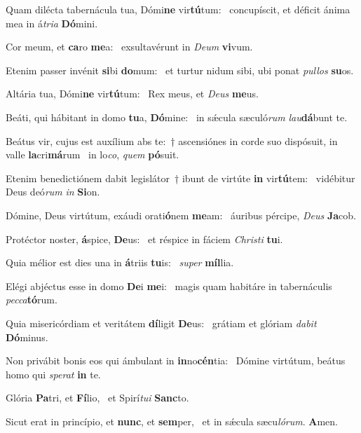 \item Quam dilécta tabernácula tua, Dómi\textbf{ne} vir\textbf{tú}tum:~\psstar{} concupíscit, et déficit ánima mea in á\textit{tria} \textbf{Dó}mini.
\item Cor meum, et \textbf{ca}ro \textbf{me}a:~\psstar{} exsultavérunt in \textit{Deum} \textbf{vi}vum.
\item Etenim passer invénit \textbf{si}bi \textbf{do}mum:~\psstar{} et turtur nidum sibi, ubi ponat \textit{pullos} \textbf{su}os.
\item Altária tua, Dómi\textbf{ne} vir\textbf{tú}\-tum:~\psstar{} Rex meus, et \textit{Deus} \textbf{me}us.
\item Beáti, qui hábitant in domo \textbf{tu}a, \textbf{Dó}mine:~\psstar{} in sǽcula sæculó\textit{rum} \textit{lau}\textbf{dá}bunt te.
\item Beátus vir, cujus est auxílium abs te:~† ascensiónes in corde suo dispósuit, in valle \textbf{la}cri\textbf{má}rum~\psstar{} in lo\textit{co}, \textit{quem} \textbf{pó}suit.
\item Etenim benedictiónem dabit legislátor~† ibunt de virtúte \textbf{in} vir\textbf{tú}tem:~\psstar{} vidébitur Deus deó\textit{rum} \textit{in} \textbf{Si}on.
\item Dómine, Deus virtútum, exáudi orati\textbf{ó}nem \textbf{me}am:~\psstar{} áuribus pércipe, \textit{Deus} \textbf{Ja}cob.
\item Protéctor noster, \textbf{á}spice, \textbf{De}us:~\psstar{} et réspice in fáciem \textit{Christi} \textbf{tu}i.
\item Quia mélior est dies una in \textbf{á}triis \textbf{tu}is:~\psstar{} \textit{super} \textbf{míl}lia.
\item Elégi abjéctus esse in domo \textbf{De}i \textbf{me}i:~\psstar{} magis quam habitáre in tabernáculis \textit{pecca}\textbf{tó}rum.
\item Quia misericórdiam et veritátem \textbf{dí}ligit \textbf{De}us:~\psstar{} grátiam et glóriam \textit{dabit} \textbf{Dó}minus.
\item Non privábit bonis eos qui ámbulant in \textbf{in}no\textbf{cén}tia:~\psstar{} Dómine virtútum, beátus homo qui \textit{sperat} \textbf{in} te.
\item Glória \textbf{Pa}tri, et \textbf{Fí}lio,~\psstar{} et Spirí\textit{tui} \textbf{Sanc}to.
\item Sicut erat in princípio, et \textbf{nunc}, et \textbf{sem}per,~\psstar{} et in sǽcula sæcu\textit{lórum}. \textbf{A}men.